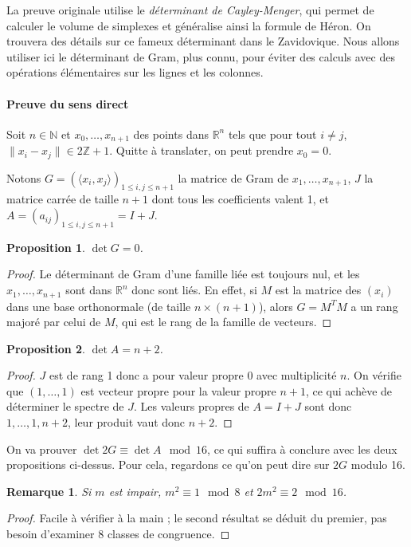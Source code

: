 \documentclass[a4paper, 11pt]{article}
\def\Z{\mathbb{Z}}
\def\N{\mathbb{N}}
\def\R{\mathbb{R}}
\newtheorem*{proposition}{Proposition}
\newtheorem*{remark}{Remarque}
\begin{document}
La preuve originale utilise le \emph{déterminant de Cayley-Menger}, qui permet
de calculer le volume de simplexes et généralise ainsi la formule de Héron. On
trouvera des détails sur ce fameux déterminant dans le Zavidovique. Nous allons
utiliser ici le déterminant de Gram, plus connu, pour éviter des calculs avec
des opérations élémentaires sur les lignes et les colonnes.

\paragraph{Preuve du sens direct}

Soit $n \in \N$ et $x_0, \ldots, x_{n+1}$ des points dans $\R^n$ tels que pour
tout $i \neq j$, $\|x_i - x_j\| \in 2\Z + 1$. Quitte à translater, on peut
prendre $x_0 = 0$.

Notons $G = (\langle x_i, x_j \rangle)_{1 \leq i,j \leq n+1}$ la matrice de Gram
de $x_1, \ldots, x_{n+1}$, $J$ la matrice carrée de taille $n+1$ dont tous les
coefficients valent 1, et $A = (a_{ij})_{1 \leq i,j \leq n+1} = I+J$.

\begin{proposition}
  $\det G = 0$.
\end{proposition}
\begin{proof}
  Le déterminant de Gram d'une famille liée est toujours nul, et les $x_1,
  \ldots, x_{n+1}$ sont dans $\R^n$ donc sont liés. En effet, si $M$ est la
  matrice des $(x_i)$ dans une base orthonormale (de taille $n \times (n+1)$),
  alors $G = M^T M$ a un rang majoré par celui de $M$, qui est le rang de la
  famille de vecteurs.
\end{proof}

\begin{proposition}
  $\det A = n+2$.
\end{proposition}
\begin{proof}
  $J$ est de rang 1 donc a pour valeur propre 0 avec multiplicité $n$. On
  vérifie que $(1,\ldots,1)$ est vecteur propre pour la valeur propre $n+1$, ce
  qui achève de déterminer le spectre de $J$. Les valeurs propres de $A = I+J$
  sont donc $1, \ldots, 1, n+2$, leur produit vaut donc $n+2$.
\end{proof}

On va prouver $\det 2G \equiv \det A \mod 16$, ce qui suffira à conclure avec
les deux propositions ci-dessus. Pour cela, regardons ce qu'on peut dire sur
$2G$ modulo 16.

\begin{remark}
  Si $m$ est impair, $m^2 \equiv 1 \mod 8$ et $2m^2 \equiv 2 \mod 16$.
\end{remark}
\begin{proof}
  Facile à vérifier à la main ; le second résultat se déduit du premier, pas
  besoin d'examiner 8 classes de congruence.
\end{proof}
\end{document}
